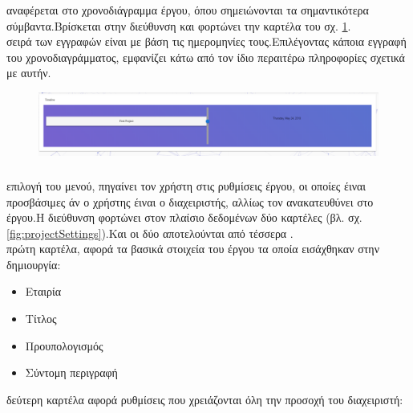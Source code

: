 \subsubsection*{}
  αναφέρεται στο χρονοδιάγραμμα έργου, όπου σημειώνονται τα σημαντικότερα σύμβαντα.Βρίσκεται στην διεύθυνση  και φορτώνει την καρτέλα του σχ. \ref{fig:projectTimeline}.\\
 σειρά των εγγραφών είναι με βάση τις ημερομηνίες τους.Επιλέγοντας κάποια εγγραφή του χρονοδιαγράμματος, εμφανίζει κάτω από τον ίδιο περαιτέρω πληροφορίες σχετικά με αυτήν.

\begin{figure}[!htb]
\includegraphics[width=\linewidth]{images/projectTimeline.png}
\caption{}
\label{fig:projectTimeline}
\end{figure}

\subsubsection*{}
 επιλογή του μενού, πηγαίνει τον χρήστη στις ρυθμίσεις έργου, οι οποίες έιναι προσβάσιμες άν ο χρήστης έιναι ο διαχειριστής, αλλίως τον ανακατευθύνει στο  έργου.Η διεύθυνση  φορτώνει στον πλαίσιο δεδομένων δύο καρτέλες (βλ. σχ. \ref{fig:projectSettings}).Και οι δύο αποτελούνται από τέσσερα .\\
 πρώτη καρτέλα, αφορά τα βασικά στοιχεία του έργου τα οποία εισάχθηκαν στην δημιουργία:\\
\begin{itemize}
	\item Εταιρία
	\item Τίτλος
	\item Προυπολογισμός
	\item Σύντομη περιγραφή
\end{itemize}

 δεύτερη καρτέλα αφορά ρυθμίσεις που χρειάζονται όλη την προσοχή του διαχειριστή:\\

